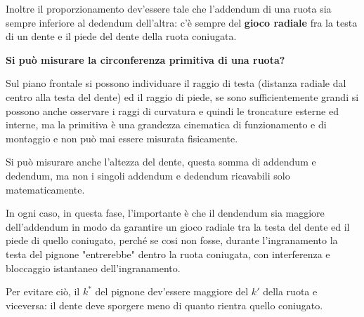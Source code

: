 \documentclass[a4paper, 15pt]{article}
\begin{document}
\begin{adjustwidth}{2in}{}
		Inoltre il proporzionamento dev'essere tale che l'addendum di una ruota sia sempre inferiore al dedendum dell'altra: c'è sempre del \textbf{gioco radiale} fra la testa di un dente e il piede del dente della ruota coniugata.\newline 
		
		
		\textbf{Si può misurare la circonferenza primitiva di una ruota?} 
		
		Sul piano frontale si possono individuare il raggio di testa (distanza radiale dal centro alla testa del dente) ed il raggio di piede, se sono sufficientemente grandi si possono anche osservare i raggi di curvatura e quindi le troncature esterne ed interne, ma la primitiva è una grandezza cinematica di funzionamento e di montaggio e non può mai essere misurata fisicamente. 
		
		Si può misurare anche l'altezza del dente, questa somma di addendum e dedendum, ma non i singoli addendum e dedendum ricavabili solo matematicamente. 
		
		In ogni caso, in questa fase, l'importante è che il dendendum sia maggiore dell'addendum in modo da garantire un gioco radiale tra la testa del dente ed il piede di quello coniugato, perché se cosi non fosse, durante l'ingranamento la testa del pignone "entrerebbe" dentro la ruota coniugata, con interferenza e bloccaggio istantaneo dell'ingranamento. 
		
		Per evitare ciò, il $k^*$ del pignone dev'essere maggiore del $k'$  della ruota e viceversa: il dente deve sporgere meno di quanto rientra quello coniugato.
\end{adjustwidth}
\end{document}
